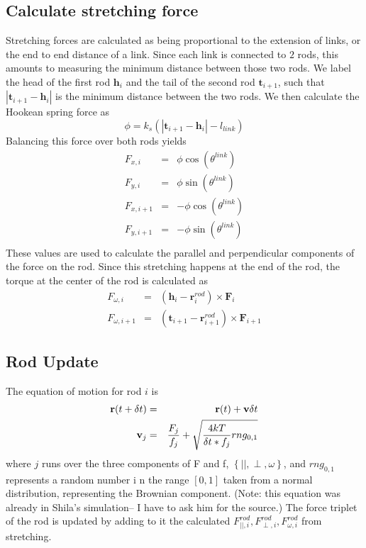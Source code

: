 \documentclass[11pt]{article}
\begin{document}
\subsection{Calculate stretching force}
Stretching forces are calculated as being proportional to the extension of links, or the end to end distance of a link. 
Since each link is connected to $2$ rods, this amounts to measuring the minimum distance between those two rods. We
label the head of the first rod $\mathbf{h}_{i}$ and the tail of the second rod $\mathbf{t}_{i+1}$, such that $|\mathbf{t}_{i+1} -
\mathbf{h}_i|$ is the minimum distance between the two rods. We then calculate the Hookean spring force as 
\begin{equation}
  \phi = k_s \left( |\mathbf{t}_{i+1}-\mathbf{h}_i|-l_{link} \right)
  \label{eqn:stretch}
\end{equation}
Balancing this force over both rods yields
\begin{eqnarray}
  F_{x,i} &=& \phi\cos{(\theta^{link})}\\\nonumber
  F_{y,i} &=& \phi\sin{(\theta^{link})}\\\nonumber
  F_{x,i+1} &=& -\phi\cos{(\theta^{link})}\\\nonumber
  F_{y,i+1} &=& -\phi\sin{(\theta^{link})}\\\nonumber
  \label{eqn:stretch_comp}
\end{eqnarray}
These values are used to calculate the parallel and perpendicular components of the force on the rod. Since this
stretching happens at the end of the rod, the torque at the center of the rod is calculated as
\begin{eqnarray}
  F_{\omega,i} &=& (\mathbf{h}_i-\mathbf{r}^{rod}_i) \times \mathbf{F}_i\\\nonumber
  F_{\omega,i+1} &=& (\mathbf{t}_{i+1}-\mathbf{r}^{rod}_{i+1}) \times \mathbf{F}_{i+1}
  \label{eqn:stretch_trq}
\end{eqnarray}
\subsection{Rod Update}
The equation of motion for rod $i$ is
\begin{eqnarray}
  \mathbf{r}(t+\delta t) &=& \mathbf{r}(t) + \mathbf{v} \delta t\\\nonumber
  \mathbf{v}_{j} &=& {F_{j}\over f_{j}} + \sqrt{{4kT\over \delta t*f_j}rng_{0,1}} 
  \label{eqn:motion}
\end{eqnarray}
where $j$ runs over the three components of F and f, $\left\{ ||, \perp, \omega\right\}$, and $rng_{0,1}$ represents a
random number i n the range $\left[ 0,1 \right]$ taken from a normal distribution, representing the Brownian component. 
(Note: this equation was already in Shila's simulation-- I have to ask him for the source.) 
The force triplet of the rod is updated by adding to it the calculated ${F^{rod}_{||,i}, F^{rod}_{\perp,i},
F^{rod}_{\omega,i}}$ from stretching.
\end{document}

